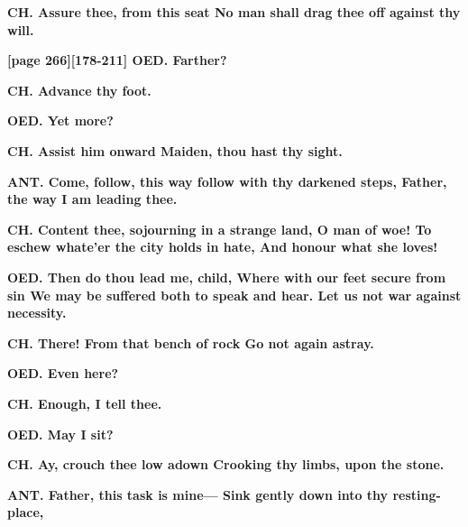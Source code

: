 \documentclass[11pt,letter]{book}
\begin{document}
\par \textbf{CH. Assure thee, from this seat No man shall drag thee off against thy will.}
\par 

\par \textbf{[page 266][178-211] OED. Farther?}
\par 

\par \textbf{CH. Advance thy foot.}
\par 

\par \textbf{OED. Yet more?}
\par 

\par \textbf{CH. Assist him onward Maiden, thou hast thy sight.}
\par 

\par \textbf{ANT. Come, follow, this way follow with thy darkened steps, Father, the way I am leading thee.}
\par 

\par \textbf{CH. Content thee, sojourning in a strange land, O man of woe! To eschew whate’er the city holds in hate, And honour what she loves!}
\par 

\par \textbf{OED. Then do thou lead me, child, Where with our feet secure from sin We may be suffered both to speak and hear. Let us not war against necessity.}
\par 

\par \textbf{CH. There! From that bench of rock Go not again astray.}
\par 

\par \textbf{OED. Even here?}
\par 

\par \textbf{CH. Enough, I tell thee.}
\par 

\par \textbf{OED. May I sit?}
\par 

\par \textbf{CH. Ay, crouch thee low adown Crooking thy limbs, upon the stone.}
\par 

\par \textbf{ANT. Father, this task is mine— Sink gently down into thy resting-place,}
\par 
\end{document}
